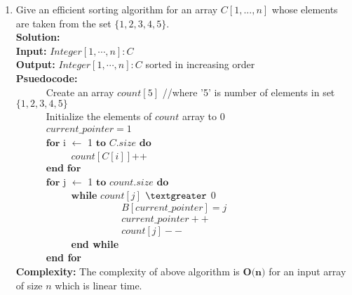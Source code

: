 \documentclass[12pt]{article}
\begin{document}
\begin{enumerate}
\begin{enumerate}
\item Give an efficient sorting algorithm for an array $C[1,...,n]$ whose elements are
taken from the set $\{1, 2, 3, 4, 5\}$.\\
\textbf{Solution:} \\
\textbf{Input:} $Integer[1, \cdots, n]: C$\\ 
\textbf{Output:} $Integer[1, \cdots, n]: C $ sorted in increasing order \\
\textbf{Psuedocode:}\\
\verb|		|Create an array $count[5]$ //where '5' is number of elements in set $\{1,2,3,4,5\}$\\
\verb|		|Initialize the elements of $count$ array to 0\\
\verb|		|$current\_pointer = 1$\\
\verb|		|$\textbf{for}$ i $\leftarrow$ 1 $\textbf{to}$ $C.size$ $\textbf{do}$ \\
\verb|		|\verb|		|$count[C[i]]$++ \\
\verb|		|$\textbf{end for}$\\
\verb|		|$\textbf{for}$ j $\leftarrow$ 1 $\textbf{to}$ $count.size$ $\textbf{do}$\\
\verb|		|\verb|		|$\textbf{while}$ $count[j]$ $\textgreater$ 0\\
\verb|		|\verb|		|\verb|		|\verb|		|$B[current\_pointer] = j$\\
\verb|		|\verb|		|\verb|		|\verb|		|$current\_pointer++$\\
\verb|		|\verb|		|\verb|		|\verb|		|$count[j]--$\\
\verb|		|\verb|		|\textbf{end while}\\
\verb|		|\textbf{end for}\\
\textbf{Complexity:} The complexity of above algorithm is $\textbf{O(n)}$ for an input array of size $n$ which is linear time.


\end{enumerate}
\end{enumerate}
\end{document}
